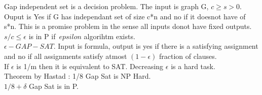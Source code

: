 \documentclass[solution,addpoints,12pt]{exam}
\begin{document}
Gap independent set is a decision problem. The input is
graph G, $c \ge s > 0$. Ouput is Yes if G has independant
set of size c*n and no if it doesnot have of s*n. This
is a promise problem in the sense all inputs donot have fixed
outputs. $s/c \le \epsilon$ is in P if\ $epsilon$
algorihtm exists.\\

$\epsilon-GAP-SAT$. Input is formula, output is yes
if there is a satisfying assignment and no if all assignments satisfy
atmost $(1 - \epsilon)$ fraction of clauses.\\
If $\epsilon$ is 1/m then it is equivalent to SAT.
Decreasing $\epsilon$ is a hard task.\\
Theorem by Hastad : 1/8 Gap Sat is NP Hard.\\
$1/8 + \delta$ Gap Sat is in P.\\
\end{document}
